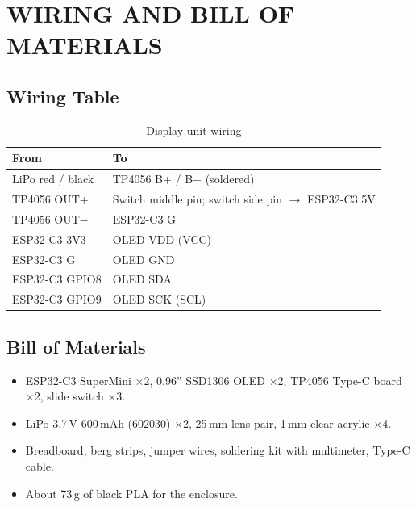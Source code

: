 \documentclass[12pt,a4paper]{report}
\begin{document}
\appendix
{}

\chapter{WIRING AND BILL OF MATERIALS}

\section{Wiring Table}
\begin{table}[H]
\centering
\caption{Display unit wiring}
\label{tab:wiring}
\begin{tabular}{l l}
\toprule
\textbf{From} & \textbf{To} \\
\midrule
LiPo red / black & TP4056 B+ / B$-$ (soldered) \\
TP4056 OUT+ & Switch middle pin; switch side pin $\rightarrow$ ESP32-C3 5V \\
TP4056 OUT$-$ & ESP32-C3 G \\
ESP32-C3 3V3 & OLED VDD (VCC) \\
ESP32-C3 G & OLED GND \\
ESP32-C3 GPIO8 & OLED SDA \\
ESP32-C3 GPIO9 & OLED SCK (SCL) \\
\bottomrule
\end{tabular}
\end{table}

\section{Bill of Materials}
\begin{itemize}
  \item ESP32-C3 SuperMini $\times$2, 0.96'' SSD1306 OLED $\times$2, TP4056 Type-C board $\times$2, slide switch $\times$3.
  \item LiPo 3.7\,V 600\,mAh (602030) $\times$2, 25\,mm lens pair, 1\,mm clear acrylic $\times$4.
  \item Breadboard, berg strips, jumper wires, soldering kit with multimeter, Type-C cable.
  \item About 73\,g of black PLA for the enclosure.
\end{itemize}
\end{document}
